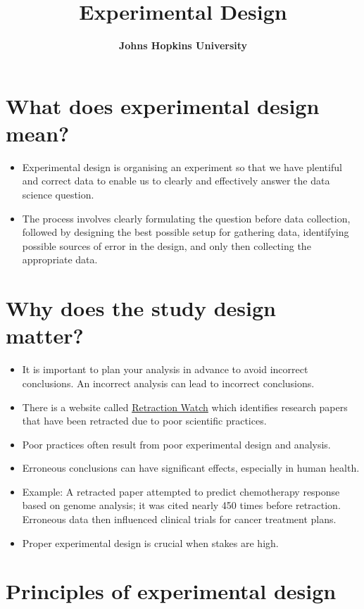 \documentclass[10pt,a4paper,twoside]{article}\usepackage[]{graphicx}\usepackage[]{xcolor}
\title{\Large \textbf{Experimental Design}}
\author{\large \textbf{Johns Hopkins University}}
\begin{document}
\maketitle
\tableofcontents
\newpage

\section{What does experimental design mean?}

\begin{itemize}
  \item Experimental design is organising an experiment so that we have plentiful and correct data to enable us to clearly and effectively answer the data science question.
  \item The process involves clearly formulating the question before data collection, followed by designing the best possible setup for gathering data, identifying possible sources of error in the design, and only then collecting the appropriate data.
\end{itemize}

\section{Why does the study design matter?}

\begin{itemize}
  \item It is important to plan your analysis in advance to avoid incorrect conclusions. An incorrect analysis can lead to incorrect conclusions.
  \item There is a website called \href{https://retractionwatch.com/}{Retraction Watch} which identifies research papers that have been retracted due to poor scientific practices.
  \item Poor practices often result from poor experimental design and analysis.
  \item Erroneous conclusions can have significant effects, especially in human health.
  \item Example: A retracted paper attempted to predict chemotherapy response based on genome analysis; it was cited nearly 450 times before retraction. Erroneous data then influenced clinical trials for cancer treatment plans.
  \item Proper experimental design is crucial when stakes are high.
\end{itemize}

\section{Principles of experimental design}
\end{document}

